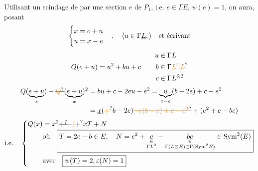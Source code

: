 Utilisant un scindage de  par une section $e$ de $P_1$, i.e. $e\in\Gamma E$, $\psi(e)=1$, on aura, posant
\[
\begin{cases}x=e+u\\ u=x-e\end{cases},\quad\inserted{u\in\Gamma\underline L,}\quad\text{et écrivant}
\]
\[
Q(e+u)=u^2+bu+c\qquad\begin{aligned}u&\in\Gamma L\\ b&\in\Gamma\unsure{L'|L}\\ c&\in\Gamma L^{\otimes2}\end{aligned}
\]
\[
\begin{aligned}Q(\underbrace{e+u}_{x})-\deleted{\unsure{Q}}(\underbrace{e+u}_{x})^2&=bu+c-2eu-e^2=\underbrace{u}_{x-e}(b-2e)+c-e^2\\ &=\underline x(\unsure{+}b-2e)\deleted{\unsure{-e(b-e)+c-e^2}}+(e^2+c-be)\end{aligned}
\]
\[
\text{i.e.}\quad\left\{\begin{aligned}Q(x)&=x^2\deleted{\unsure{+}}\unsure{-|+}xT+N\\[-2pt] &\text{où}\quad\boxed{T=2e-b\in E,\quad N=e^2+\underset{\substack{\in\\\Gamma L^2}}{c}-\underset{\substack{\in\\\Gamma(L\otimes E)\subset\Gamma(\mathrm{Sym}^2E)}}{be}\in\mathrm{Sym}^2(E)}\\ &\text{avec}\quad\boxed{\psi(T)=2,\varepsilon(N)=1}\end{aligned}\right.
\]

